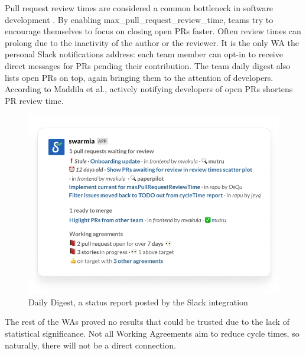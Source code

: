 Pull request review times are considered a common bottleneck in software development \cite{maddila_nudge_2022}. By enabling max\_pull\_request\_review\_time, teams try to encourage themselves to focus on closing open PRs faster. Often review times can prolong due to the inactivity of the author or the reviewer. It is the only WA the personal Slack notifications address: each team member can opt-in to receive direct messages for PRs pending their contribution. The team daily digest also lists open PRs on top, again bringing them to the attention of developers. According to Maddila et al., actively notifying developers of open PRs shortens PR review time.~\cite{maddila_nudge_2022}

\begin{figure}[ht]
    \centering
    \includegraphics[width=13.5cm]{LaTeX/images/daily-digest.png}
    \caption{Daily Digest, a status report posted by the Slack integration}
    \label{fig:daily_digest}
\end{figure}

The rest of the WAs proved no results that could be trusted due to the lack of statistical significance. Not all Working Agreements aim to reduce cycle times, so naturally, there will not be a direct connection.



